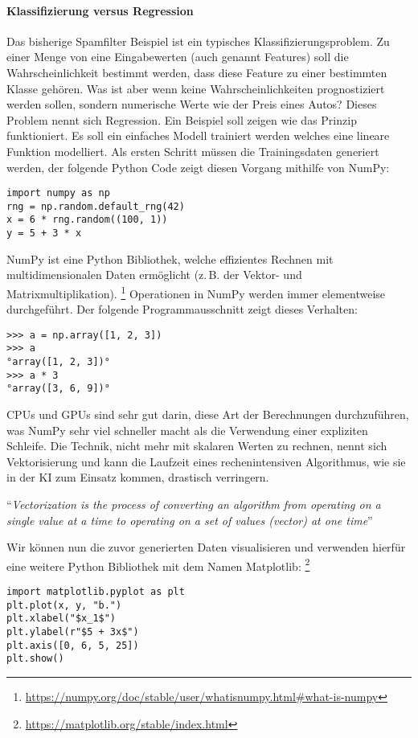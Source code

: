 \paragraph{Klassifizierung versus Regression}
Das bisherige Spamfilter Beispiel ist ein typisches
Klassifizierungsproblem. Zu einer Menge von eine Eingabewerten
(auch genannt Features) soll die Wahrscheinlichkeit bestimmt werden,
dass diese Feature zu einer bestimmten Klasse gehören.
Was ist aber wenn keine Wahrscheinlichkeiten
prognostiziert werden sollen, sondern numerische Werte wie
der Preis eines Autos? Dieses Problem nennt sich Regression.
Ein Beispiel soll zeigen wie das Prinzip funktioniert.
Es soll ein einfaches Modell trainiert werden welches eine lineare
Funktion modelliert. Als ersten Schritt müssen die Trainingsdaten generiert werden,
der folgende Python Code zeigt diesen Vorgang mithilfe von NumPy:
\begin{lstlisting}
import numpy as np
rng = np.random.default_rng(42)
x = 6 * rng.random((100, 1))
y = 5 + 3 * x
\end{lstlisting}
NumPy ist eine Python Bibliothek, welche effizientes Rechnen mit
multidimensionalen Daten ermöglicht (z.\,B. der Vektor- und Matrixmultiplikation).
\footnote{\url{https://numpy.org/doc/stable/user/whatisnumpy.html\#what-is-numpy}}
Operationen in NumPy werden immer elementweise durchgeführt. Der folgende Programmausschnitt
zeigt dieses Verhalten:
\begin{lstlisting}
>>> a = np.array([1, 2, 3])
>>> a
°array([1, 2, 3])°
>>> a * 3
°array([3, 6, 9])°
\end{lstlisting}
CPUs und GPUs sind sehr gut darin, diese Art der Berechnungen durchzuführen,
was NumPy sehr viel schneller macht als die Verwendung einer expliziten Schleife.
Die Technik, nicht mehr mit skalaren Werten zu rechnen,
nennt sich Vektorisierung und kann
die Laufzeit eines rechenintensiven Algorithmus,
wie sie in der KI zum Einsatz kommen, drastisch verringern.
\begin{aquote}{\parencite{online:vectorization}}
  \enquote{\textit{Vectorization is the process of converting an algorithm
      from operating on a single value at a time to
      operating on a set of values (vector) at one time}}
\end{aquote}
Wir können nun die zuvor generierten Daten visualisieren und verwenden hierfür
eine weitere Python Bibliothek mit dem Namen Matplotlib:
\footnote{\url{https://matplotlib.org/stable/index.html}}
\begin{lstlisting}
import matplotlib.pyplot as plt
plt.plot(x, y, "b.")
plt.xlabel("$x_1$")
plt.ylabel(r"$5 + 3x$")
plt.axis([0, 6, 5, 25])
plt.show()
\end{lstlisting}
